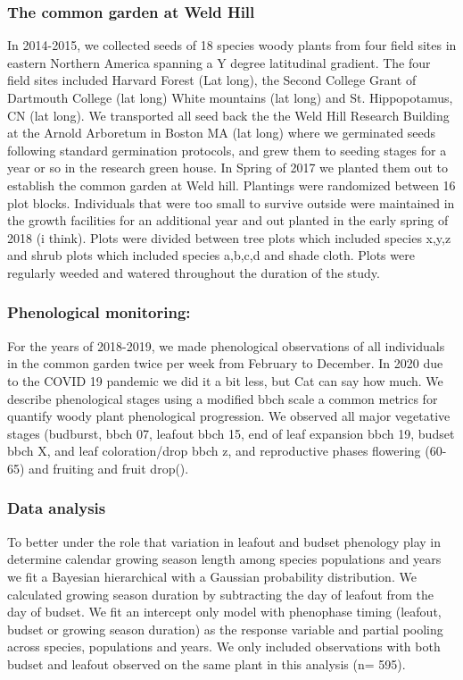 \documentclass[12 pt]{article}
\begin{document}
\subsubsection{The common garden at Weld Hill}
In 2014-2015, we collected seeds of 18 species woody plants from four field sites in eastern Northern America spanning a Y degree latitudinal gradient. The four field sites included Harvard Forest (Lat long), the Second College Grant of Dartmouth College (lat long) White mountains (lat long) and St. Hippopotamus, CN (lat long). We transported all seed back the the Weld Hill Research Building at the Arnold Arboretum in Boston MA (lat long) where we germinated seeds following standard germination protocols, and grew them to seeding stages for a year or so in the research green house. In Spring of 2017 we planted them out to establish the common garden at Weld hill. Plantings were randomized between 16 plot blocks. Individuals that were too small to survive outside were maintained in the growth facilities for an additional year and out planted in the early spring of 2018 (i think). Plots were divided between tree plots which included species x,y,z and shrub plots which included species a,b,c,d and shade cloth. Plots were regularly weeded and watered throughout the duration of the study.

\subsubsection{Phenological monitoring:}
For the years of 2018-2019, we made phenological observations of all individuals in the common garden twice per week from February to December. In 2020 due to the COVID 19 pandemic we did it a bit less, but Cat can say how much. We describe phenological stages using a modified bbch scale \citep{} a common metrics for quantify woody plant phenological progression. We observed all major vegetative stages (budburst, bbch 07, leafout bbch 15, end of leaf expansion bbch 19, budset bbch X, and leaf coloration/drop bbch z, and reproductive phases flowering (60-65) and fruiting and fruit drop(). 

\subsubsection{Data analysis}
To better under the role that variation in leafout and budset phenology play in determine calendar growing season length among species populations and years we fit a Bayesian hierarchical with a Gaussian probability distribution. We calculated growing season duration by subtracting the day of leafout from the day of budset. We fit an intercept only model with phenophase timing (leafout, budset or growing season duration) as the response variable and partial pooling across species, populations and years. We only included observations with both budset and leafout observed on the same plant in this analysis (n= 595).
\end{document}
